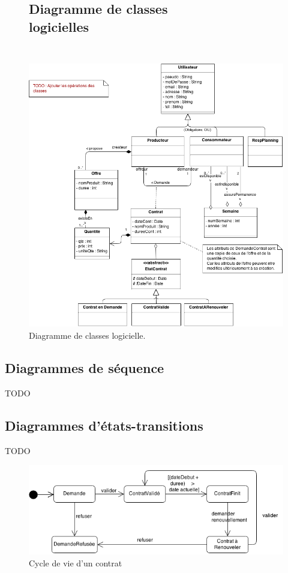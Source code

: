 \documentclass[12pt]{report}
\begin{document}
\begin{figure}[!hp]
\centering
\subsection{Diagramme de classes logicielles~~~~~~~~~~~~~~~~~~~~~~~~~~~~~~~}
\includegraphics[height=1.\textwidth]{./ressources/class_logicielle.png}
\caption{Diagramme de classes logicielle.}
\end{figure}
\clearpage

\subsection{Diagrammes de séquence}
TODO

\subsection{Diagrammes d'états-transitions}
TODO
\begin{figure}[!hp]
\centering
\includegraphics[width=1.\textwidth]{./ressources/etat_transition_contrat.png}
\caption{Cycle de vie d'un contrat}
\end{figure}
\clearpage
\end{document}
